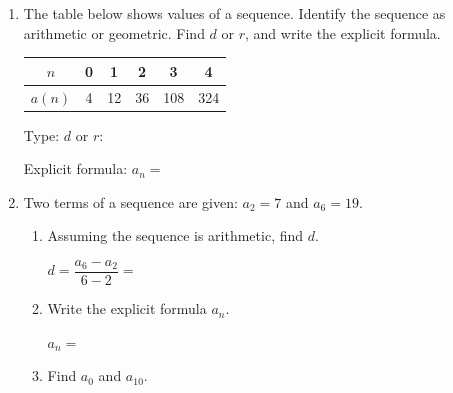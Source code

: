\documentclass[10pt]{article}
\begin{document}

\vspace{0.10in}

\begin{enumerate}[itemsep=16pt]

\item The table below shows values of a sequence. Identify the sequence as arithmetic or
      geometric. Find $d$ or $r$, and write the explicit formula.

      \vspace{0.06in}
      \renewcommand{\arraystretch}{1.5}
      \begin{tabular}{|c|c|c|c|c|c|}
        \hline
        $n$    & 0  & 1  & 2   & 3   & 4   \\
        \hline
        $a(n)$ & 4  & 12 & 36  & 108 & 324 \\
        \hline
      \end{tabular}

      \vspace{0.06in}
      Type: \smash{\gradedblank[id=hw1a, type=short, check=text, points=1, answer={geometric}]{3cm}{13pt}} \quad $d$ or $r$: \smash{\gradedblank[id=hw1b, type=short, points=1, answer={r = 3}]{2.5cm}{13pt}}

      Explicit formula: $a_n = $ \smash{\gradedblank[id=hw1c, type=short, points=2, answer={4 \cdot 3^n}]{5cm}{13pt}}

\item Two terms of a sequence are given: $a_2 = 7$ and $a_6 = 19$.

      \begin{enumerate}[label=(\alph*), itemsep=8pt]
        \item Assuming the sequence is arithmetic, find $d$.

              $d = \dfrac{a_6 - a_2}{6 - 2} = $ \smash{\gradedblank[id=hw2a, type=short, points=1, answer={3}]{4cm}{13pt}} \quad {}

        \item Write the explicit formula $a_n$.

              $a_n = $ \smash{\gradedblank[id=hw2b, type=short, points=2, answer={3n + 1}]{6cm}{13pt}} \quad {}

        \item Find $a_0$ and $a_{10}$.


\end{enumerate}
\end{enumerate}
\end{document}
